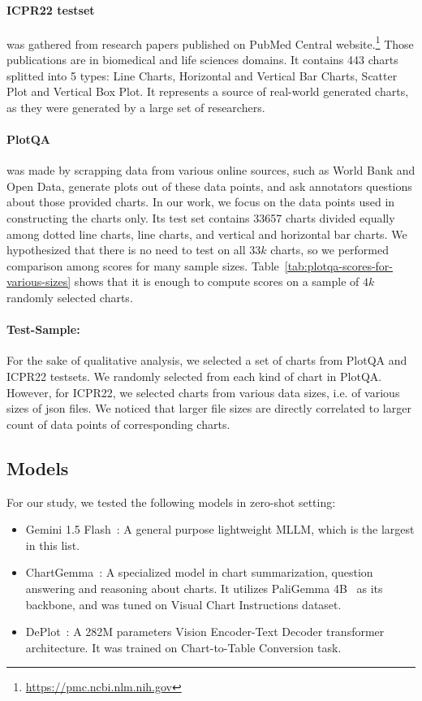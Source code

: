 \documentclass[
	letterpaper, %
]{jdf}
\begin{document}
\paragraph{ICPR22 testset~\cite{rousseau2023pattern}} was gathered from research papers published on PubMed Central website.\footnote{\href{https://pmc.ncbi.nlm.nih.gov}{https://pmc.ncbi.nlm.nih.gov}}
Those publications are in biomedical and life sciences domains.
It contains 443 charts splitted into 5 types: Line Charts, Horizontal and Vertical Bar Charts, Scatter Plot and Vertical Box Plot.
It represents a source of real-world generated charts, as they were generated by a large set of researchers.

\paragraph{PlotQA~\cite{methani2020plotqa}} was made by scrapping data from various online sources, such as World Bank and Open Data, generate plots out of these data points, and ask annotators questions about those provided charts.
In our work, we focus on the data points used in constructing the charts only.
Its test set contains 33657 charts divided equally among dotted line charts, line charts, and vertical and horizontal bar charts.
We hypothesized that there is no need to test on all $33k$ charts, so we performed comparison among scores for many sample sizes.
Table~\ref{tab:plotqa-scores-for-various-sizes} shows that it is enough to compute scores on a sample of $4k$ randomly selected charts.

\paragraph{Test-Sample:} For the sake of qualitative analysis, we selected a set of charts from PlotQA and ICPR22 testsets.
We randomly selected from each kind of chart in PlotQA.
However, for ICPR22, we selected charts from various data sizes, i.e. of various sizes of json files.
We noticed that larger file sizes are directly correlated to larger count of data points of corresponding charts.

\subsection{Models}\label{ssect:models}
For our study, we tested the following models in zero-shot setting:
\begin{itemize}
  \item Gemini 1.5 Flash~\cite{team2024gemini}: A general purpose lightweight MLLM, which is the largest in this list.
     \item ChartGemma~\cite{masry2024chartgemma}: A specialized model in chart summarization, question answering and reasoning about charts.
       It utilizes PaliGemma 4B~\cite{beyer2024paligemma} as its backbone, and was tuned on Visual Chart Instructions dataset.
     \item DePlot~\cite{liu2022deplot}: A 282M parameters Vision Encoder-Text Decoder transformer architecture.
         It was trained on Chart-to-Table Conversion task.
       \end{itemize}
\end{document}
